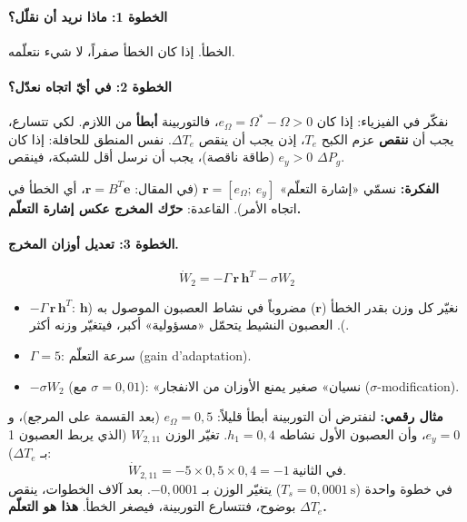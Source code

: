 \documentclass[11pt,a4paper]{article}
\newcommand{\fr}[1]{\textfrench{#1}}
\newcommand{\bv}[1]{\boldsymbol{#1}}
\newcommand{\Fikra}{\textbf{الفكرة: }}
\newcommand{\Mithal}{\textbf{مثال رقمي: }}
\begin{document}
\paragraph{الخطوة 1: ماذا نريد أن نقلّل؟} الخطأ. إذا كان الخطأ صفراً، لا شيء نتعلّمه.

\paragraph{الخطوة 2: في أيّ اتجاه نعدّل؟}
نفكّر في الفيزياء: إذا كان $e_\Omega = \Omega^*-\Omega > 0$، فالتوربينة \textbf{أبطأ} من اللازم. لكي
تتسارع، يجب أن \textbf{ننقص} عزم الكبح $T_e$، إذن يجب أن ينقص $\Delta T_e$.
نفس المنطق للحافلة: إذا كان $e_y>0$ (طاقة ناقصة)، يجب أن نرسل أقل للشبكة، فينقص $\Delta P_g$.
\begin{fikra}
\Fikra
نسمّي «إشارة التعلّم» $\bv{r} = [e_\Omega;\ e_y]$ (في المقال: $\bv{r}=B^T\bv{e}$، أي الخطأ في اتجاه الأمر).
القاعدة: \textbf{حرّك المخرج عكس إشارة التعلّم.}
\end{fikra}

\paragraph{الخطوة 3: تعديل أوزان المخرج.}
\begin{equation}
\dot W_2 = -\Gamma\,\bv{r}\,\bv{h}^T - \sigma W_2
\end{equation}
\begin{itemize}
\item $-\Gamma\,\bv{r}\,\bv{h}^T$: نغيّر كل وزن بقدر الخطأ ($\bv{r}$) مضروباً في نشاط العصبون الموصول به ($\bv{h}$).
العصبون النشيط يتحمّل «مسؤولية» أكبر، فيتغيّر وزنه أكثر.
\item $\Gamma=5$: سرعة التعلّم (\fr{gain d'adaptation}).
\item $-\sigma W_2$ (مع $\sigma=0{,}01$): «نسيان» صغير يمنع الأوزان من الانفجار (\fr{$\sigma$-modification}).
\end{itemize}
\begin{mithal}
\Mithal
لنفترض أن التوربينة أبطأ قليلاً: $e_\Omega = 0{,}5$ (بعد القسمة على المرجع)، و $e_y=0$، وأن العصبون
الأول نشاطه $h_1 = 0{,}4$. تغيّر الوزن $W_{2,11}$ (الذي يربط العصبون 1 بـ $\Delta T_e$):
\[
\dot W_{2,11} = -5\times 0{,}5\times 0{,}4 = -1\ \text{في الثانية}.
\]
في خطوة واحدة ($T_s = 0{,}0001\ \mathrm{s}$) يتغيّر الوزن بـ $-0{,}0001$. بعد آلاف الخطوات، ينقص
$\Delta T_e$ بوضوح، فتتسارع التوربينة، فيصغر الخطأ. \textbf{هذا هو التعلّم.}
\end{mithal}
\end{document}
